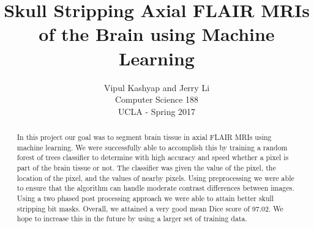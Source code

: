 \documentclass[letterpaper, 10 pt, conference]{ieeeconf}
\title{\LARGE \bf
Skull Stripping Axial FLAIR MRIs\\ of the Brain using Machine Learning
}
\author{Vipul Kashyap and Jerry Li \\ %
Computer Science 188 \\
UCLA - Spring 2017 
}
\begin{document}
\maketitle
\thispagestyle{empty}
\pagestyle{empty}

\begin{abstract}
In this project our goal was to segment brain tissue in axial FLAIR MRIs using machine learning. We were successfully able to accomplish this by training a random forest of trees classifier to determine with high accuracy and speed whether a pixel is part of the brain tissue or not. The classifier was given the value of the pixel, the location of the pixel, and the values of nearby pixels. Using preprocessing we were able to ensure that the algorithm can handle moderate contrast differences between images. Using a two phased post processing approach we were able to attain better skull stripping bit masks. Overall, we attained a very good mean Dice score of 97.02. We hope to increase this in the future by using a larger set of training data.
\end{abstract}
\end{document}
